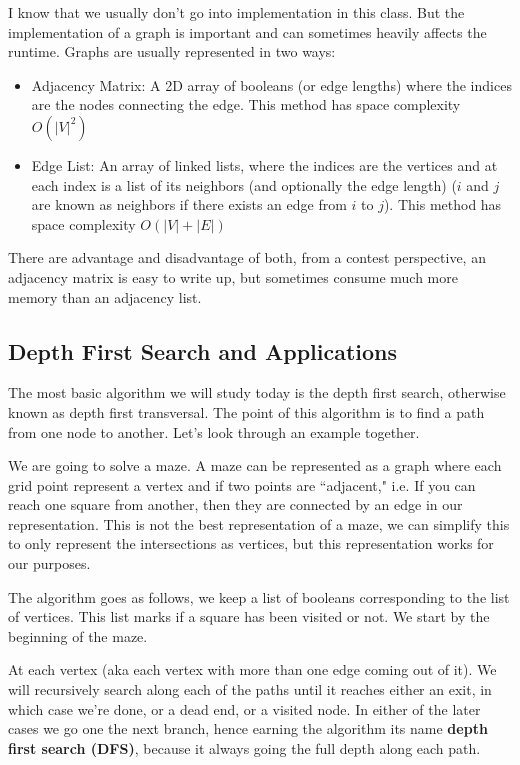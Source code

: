 \documentclass[12 pt, twoside] {article}
\begin{document}
{I know that we usually don't go into implementation in this class. But the
implementation of a graph is important and can sometimes heavily affects the runtime.
Graphs are usually represented in two ways:
\begin{itemize}
    \item Adjacency Matrix: A 2D array of booleans (or edge lengths) where the
        indices are the nodes connecting the edge. This method has space
        complexity $O(|V|^2)$
    \item Edge List: An array of linked lists, where the indices are the
        vertices and at each index is a list of its neighbors (and optionally
        the edge length) ($i$ and $j$ are known as neighbors if there exists an
        edge from $i$ to $j$). This method has space complexity $O(|V| + |E|)$
\end{itemize}

There are advantage and disadvantage of both, from a contest perspective, an
adjacency matrix is easy to write up, but sometimes consume much more memory
than an adjacency list.

\subsection*{Depth First Search and Applications}

The most basic algorithm we will study today is the depth first search,
otherwise known as depth first transversal. The point of this algorithm is to
find a path from one node to another. Let's look through an example together.

We are going to solve a maze. A maze can be represented as a graph where each
grid point represent a vertex and if two points are ``adjacent," i.e. If you can
reach one square from another, then they are connected by an edge in our
representation. This is not the best representation of a maze, we can simplify
this to only represent the intersections as vertices, but this representation
works for our purposes.

The algorithm goes as follows, we keep a list of booleans corresponding to the
list of vertices. This list marks if a square has been visited or not. We start
by the beginning of the maze.

At each vertex (aka each vertex with more than one edge coming out of it).
We will recursively search along each of the paths until it reaches either an
exit, in which case we're done, or a dead end, or a visited node. In either of
the later cases we go one the next branch, hence earning the algorithm its name
\textbf{depth first search (DFS)}, because it always going the full depth along
each path.

}
\end{document}
